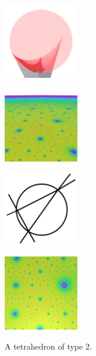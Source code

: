 \documentclass[suppldata, dvipdfmx]{interact}
\theoremstyle{plain}%
\theoremstyle{definition}
\theoremstyle{remark}
\theoremstyle{problemstyle}
\begin{document}
\begin{figure}[h!tbp]
  \begin{minipage}[t]{0.23\textwidth}
   \centering
   \includegraphics[width=1.3in,
   keepaspectratio]{./img/sphairahedron/tetrahedron/sphairahedralPrism_b.jpg}
   \subcaption{}
   \label{fig:tetrahedronPrismInf_b}
  \end{minipage}
  \hspace*{\fill}
  \begin{minipage}[t]{0.23\textwidth}
   \centering
   \includegraphics[width=1.3in, keepaspectratio]{./img/sphairahedron/tetrahedron/limitset_b.jpg}
   \subcaption{}
   \label{fig:tetrahedronLimitsetInf_b}
  \end{minipage}
 \hspace*{\fill}
  \begin{minipage}[t]{0.23\textwidth}
   \centering
   \includegraphics[width=1.3in, keepaspectratio]{./img/HexahedraWithSphericalFaces/tetrahedron/slice_b.jpg}
   \subcaption{}
   \label{fig:tetrahedronSlice_b}
  \end{minipage}
 \hspace*{\fill}
  \begin{minipage}[t]{0.23\textwidth}
   \centering
   \includegraphics[width=1.3in, keepaspectratio]{./img/sphairahedron/tetrahedron/limitsetAbove_b.jpg}
   \subcaption{}
   \label{fig:tetrahedronAbove_b}
  \end{minipage}
 \hspace*{\fill}
 \caption{A tetrahedron of type 2.}
 \label{fig:tetrahedronInf_b}
\end{figure}
\end{document}
